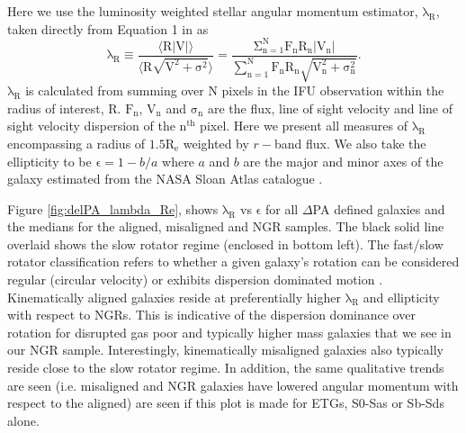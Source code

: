 Here we use the luminosity weighted stellar angular momentum estimator, $\mathrm{\lambda_R}$, taken directly from Equation 1 in \citet{emsellem2007} as
\begin{equation} \label{eq:lambda_R}
\mathrm{\lambda_{R} \equiv \frac{\langle R | V | \rangle}{ \langle R \sqrt{ V^{2} + \sigma^{2} } \rangle } = \frac{ \Sigma_{ n = 1 }^{ N } F_{ n } R_ { n } \left| V_{ n } \right| }{ \sum_{ n = 1 }^{ N } F_{n} R_{ n } \sqrt{ V_{ n }^{ 2 } + \sigma_{ n }^{ 2 } } }.}
\end{equation}
$\mathrm{\lambda_R}$ is calculated from summing over N pixels in the IFU observation within the radius of interest, $\mathrm{R}$. $\mathrm{F_{n}}$, $\mathrm{V_{n}}$ and $\mathrm{\sigma_{n}}$ are the flux, line of sight velocity and line of sight velocity dispersion of the $\mathrm{n^{th}}$ pixel. Here we present all measures of $\mathrm{\lambda_R}$ encompassing a radius of $\mathrm{1.5R_e}$ weighted by $r-$band flux. We also take the ellipticity to be $\mathrm{\epsilon} = 1 - b/a$ where $a$ and $b$ are the major and minor axes of the galaxy estimated from the NASA Sloan Atlas catalogue \cite[used for target selection in MaNGA;][]{blanton2011}.

Figure \ref{fig:delPA_lambda_Re}, shows $\mathrm{\lambda_R}$ vs $\mathrm{\epsilon}$ for all $\Delta$PA defined galaxies and the medians for the aligned, misaligned and NGR samples. The black solid line overlaid shows the slow rotator regime (enclosed in bottom left). The fast/slow rotator classification refers to whether a given galaxy's rotation can be considered regular (circular velocity) or exhibits dispersion dominated motion \citep[][]{emsellem2007}. Kinematically aligned galaxies reside at preferentially higher $\mathrm{\lambda_R}$ and ellipticity with respect to NGRs. This is indicative of the dispersion dominance over rotation for disrupted gas poor and typically higher mass galaxies that we see in our NGR sample. Interestingly, kinematically misaligned galaxies also typically reside close to the slow rotator regime. In addition, the same qualitative trends are seen (i.e. misaligned and NGR galaxies have lowered angular momentum with respect to the aligned) are seen if this plot is made for ETGs, S0-Sas or Sb-Sds alone. 

